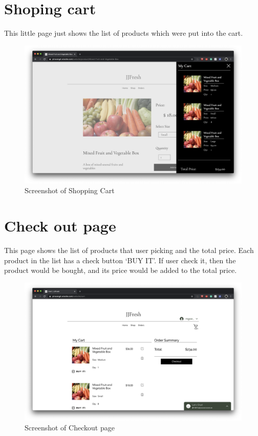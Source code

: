 \clearpage
\section*{Shoping cart}
This little page just shows the list of products which were put into the cart.
\begin{figure}[htp]
\centering
\includegraphics[width=\textwidth]{Figures/shoppingCart.png}
\caption{Screenshot of Shopping Cart}
\label{fig:shoppingCart}
\end{figure}

\clearpage
\section*{Check out page}
This page shows the list of products that user picking and the total price. Each product in the list has a check button ‘BUY IT’. If user check it, then the product would be bought, and its price would be added to the total price.
\begin{figure}[htp]
\centering
\includegraphics[width=\textwidth]{Figures/checkoutPage.png}
\caption{Screenshot of Checkout page}
\label{fig:checkoutPage}
\end{figure}


